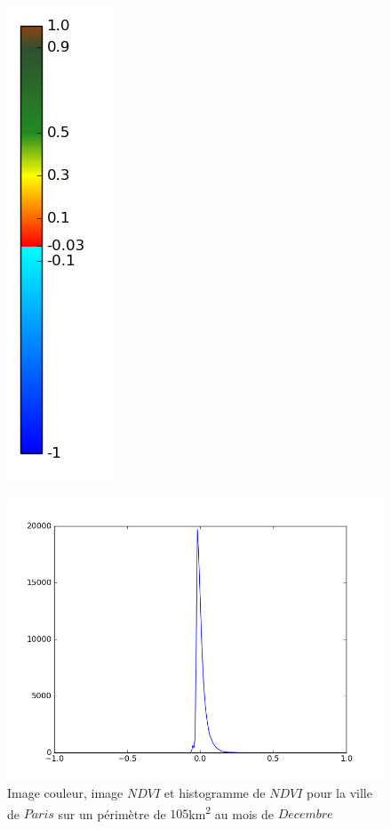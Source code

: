 \documentclass{book}
\begin{document}
\begin{figure}[H]
{\includegraphics[scale=0.4]{../3_ndvi/images/colormap.png}
}
\begin{center}
\includegraphics[scale=0.4]{../3_ndvi/images/Paris/12_ndvi_histo.png}
\end{center}
\caption{Image couleur, image $NDVI$ et histogramme de $NDVI$ pour la ville de $Paris$ sur un périmètre de $105$km\textsuperscript{2} au mois de $Decembre$}
\label{paris_ndvi}
\end{figure}
\end{document}
